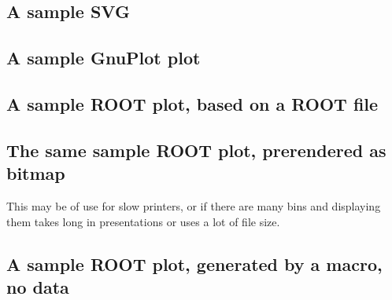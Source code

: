 \documentclass{article}
\begin{document}
\subsection*{A sample SVG}

\subsection*{A sample GnuPlot plot}

\subsection*{A sample ROOT plot, based on a ROOT file}

\subsection*{The same sample ROOT plot, prerendered as bitmap}
This may be of use for slow printers, or if there are many bins and displaying them takes long
in presentations or uses a lot of file size.\\

\subsection*{A sample ROOT plot, generated by a macro, no data}
\end{document}
